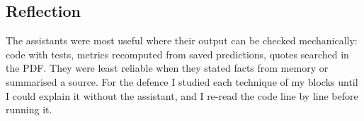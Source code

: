\subsection*{Reflection}

The assistants were most useful where their output can be checked mechanically: code with tests,
metrics recomputed from saved predictions, quotes searched in the PDF. They were least reliable when they
stated facts from memory or summarised a source. For the defence I studied each technique of my blocks
until I could explain it without the assistant, and I re-read the code line by line before running it.

